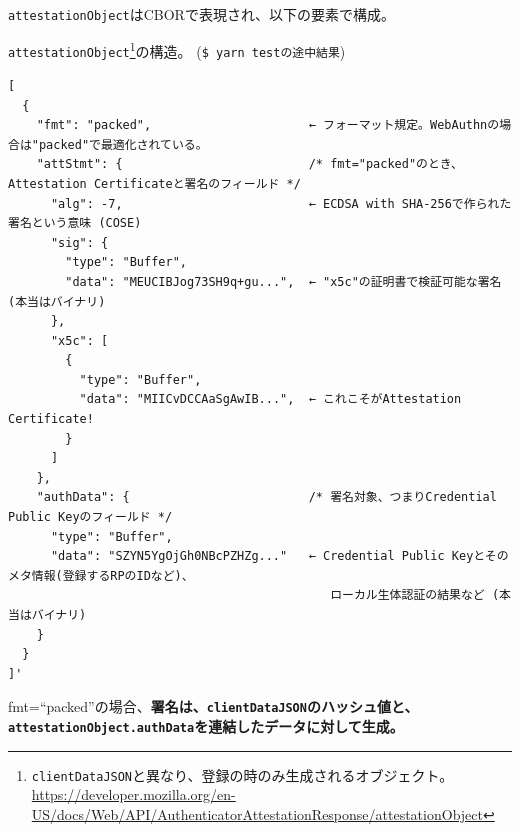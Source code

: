 \documentclass[12pt,dvipdfmx,uplatex]{beamer}
\begin{document}
\begin{frame}[fragile]
\small
\texttt{attestationObject}はCBORで表現され、以下の要素で構成。
\begin{exampleblock}{\footnotesize \texttt{attestationObject}\footnote[frame]{\tiny \texttt{clientDataJSON}と異なり、登録の時のみ生成されるオブジェクト。\url{https://developer.mozilla.org/en-US/docs/Web/API/AuthenticatorAttestationResponse/attestationObject}}の構造。 (\texttt{\$ yarn testの途中結果})}
{\tiny
\begin{verbatim}
[
  {
    "fmt": "packed",                      ← フォーマット規定。WebAuthnの場合は"packed"で最適化されている。
    "attStmt": {                          /* fmt="packed"のとき、Attestation Certificateと署名のフィールド */
      "alg": -7,                          ← ECDSA with SHA-256で作られた署名という意味 (COSE)
      "sig": {
        "type": "Buffer",
        "data": "MEUCIBJog73SH9q+gu...",  ← "x5c"の証明書で検証可能な署名 (本当はバイナリ)
      },
      "x5c": [
        {
          "type": "Buffer",
          "data": "MIICvDCCAaSgAwIB...",  ← これこそがAttestation Certificate!
        }
      ]
    },
    "authData": {                         /* 署名対象、つまりCredential Public Keyのフィールド */
      "type": "Buffer",
      "data": "SZYN5YgOjGh0NBcPZHZg..."   ← Credential Public Keyとそのメタ情報(登録するRPのIDなど)、
                                             ローカル生体認証の結果など (本当はバイナリ)
    }
  }
]'
\end{verbatim}
}
\end{exampleblock}
fmt=``packed''の場合、\textbf{署名は、\texttt{clientDataJSON}のハッシュ値と、\texttt{attestationObject.authData}を連結したデータに対して生成。}
\end{frame}
\end{document}
